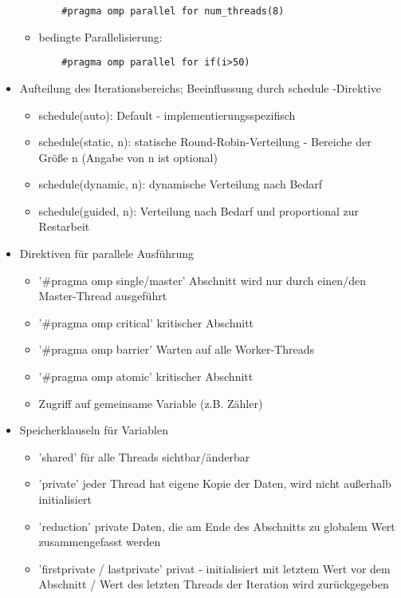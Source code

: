 \documentclass[10pt]{article}
\begin{document}
\begin{itemize}
\begin{itemize}
\begin{lstlisting}
    #pragma omp parallel for num_threads(8)
\end{lstlisting}
          \item bedingte Parallelisierung:
                \begin{lstlisting}
    #pragma omp parallel for if(i>50)
\end{lstlisting}
        \end{itemize}
  \item Aufteilung des Iterationsbereichs; Beeinflussung durch schedule -Direktive
        \begin{itemize}
          \item schedule(auto): Default - implementierungsspezifisch
          \item schedule(static, n): statische Round-Robin-Verteilung - Bereiche der Größe n (Angabe von n ist optional)
          \item schedule(dynamic, n): dynamische Verteilung nach Bedarf
          \item schedule(guided, n): Verteilung nach Bedarf und proportional zur Restarbeit
        \end{itemize}
  \item Direktiven für parallele Ausführung
        \begin{itemize}
          \item '\#pragma omp single/master' Abschnitt wird nur durch einen/den Master-Thread ausgeführt
          \item '\#pragma omp critical' kritischer Abschnitt
          \item '\#pragma omp barrier' Warten auf alle Worker-Threads
          \item '\#pragma omp atomic' kritischer Abschnitt \item Zugriff auf gemeinsame Variable (z.B. Zähler)
        \end{itemize}
  \item Speicherklauseln für Variablen
        \begin{itemize}
          \item 'shared' für alle Threads sichtbar/änderbar
          \item 'private' jeder Thread hat eigene Kopie der Daten, wird nicht außerhalb initialisiert
          \item 'reduction' private Daten, die am Ende des Abschnitts zu globalem Wert zusammengefasst werden
          \item 'firstprivate / lastprivate' privat - initialisiert mit letztem Wert vor dem Abschnitt / Wert des letzten Threads der Iteration wird zurückgegeben

\end{itemize}
\end{itemize}
\end{document}
